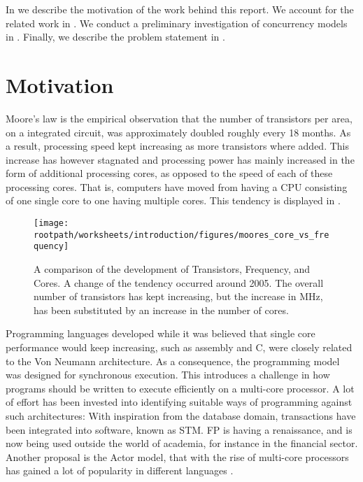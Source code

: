 \makeatletter {}\makeatother
{}
In  we describe the motivation of the work behind this report. We account for the related work in . We conduct a preliminary investigation of concurrency models in . Finally, we describe the problem statement in .
\label{chap:intro}

\section{Motivation}
Moore's law\cite{moore1965cramming} is the empirical observation that the number of transistors per area, on a integrated circuit, was approximately doubled roughly every 18 months\cite[p. 203]{mack2011fifty}. As a result, processing speed kept increasing as more transistors where added. This increase has however stagnated and processing power has mainly increased in the form of additional processing cores, as opposed to the speed of each of these processing cores\cite[p. 22]{sevenModels}. That is, computers have moved from having a \ac{CPU} consisting of one single core to one having multiple cores. This tendency is displayed in . 
\label{sec:motivation}

\begin{figure}[htbp]
\centering
 \texttt{[image: \\rootpath/worksheets/introduction/figures/moores\_core\_vs\_frequency]} 
 \caption{A comparison of the development of Transistors, Frequency, and Cores\cite{isca2009}. A change of the tendency occurred around 2005. The overall number of transistors has kept increasing, but the increase in MHz, has been substituted by an increase in the number of cores.}
\label{fig:moores_in_reality}
\end{figure}

Programming languages developed while it was believed that single core performance would keep increasing, such as assembly and C, were closely related to the Von Neumann architecture. As a consequence, the programming model was designed for synchronous execution. This introduces a challenge in how programs should be written to execute efficiently on a multi-core processor. A lot of effort has been invested into identifying suitable ways of programming against such architectures: With inspiration from the database domain, transactions have been integrated into software, known as \ac{STM}\cite{shavit1997software}\cite{scherer2005advanced}. \ac{FP} is having a renaissance, and is now being used outside the world of academia, for instance in the financial sector\cite{minsky2008caml}. Another proposal is the Actor model\cite{hewitt1973universal}, that with the rise of multi-core processors has gained a lot of popularity in different languages  \cite{haller2007actors}\cite{hewitt2014actor}. 

